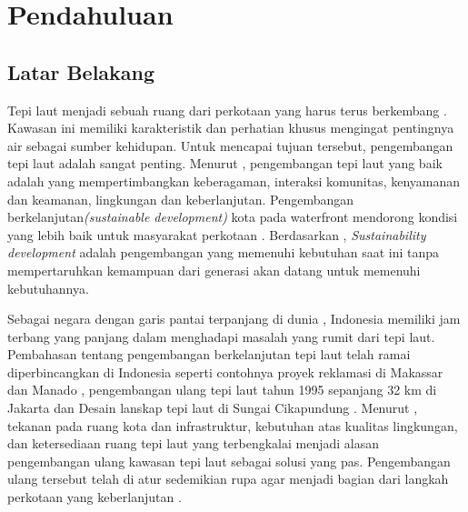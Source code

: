 \documentclass[../projects/thesis.tex]{subfiles}
\begin{document}
\chapter{Pendahuluan}\label{chap:pendahuluan}

\section{Latar Belakang}
Tepi laut menjadi sebuah ruang dari perkotaan yang harus terus berkembang \cite{shamsuddin2013}. Kawasan ini memiliki karakteristik dan perhatian khusus mengingat pentingnya air sebagai sumber kehidupan. Untuk mencapai tujuan tersebut, pengembangan tepi laut adalah sangat penting. Menurut \cite{hussein2014}, pengembangan tepi laut yang baik adalah yang mempertimbangkan keberagaman, interaksi komunitas, kenyamanan dan keamanan, lingkungan dan keberlanjutan. Pengembangan berkelanjutan\textit{(sustainable development)} kota pada waterfront mendorong kondisi yang lebih baik untuk masyarakat perkotaan \citep{brebbia2016sustainable}.
Berdasarkan \cite{imperatives1987}, \textit{Sustainability development} adalah pengembangan yang memenuhi kebutuhan saat ini tanpa mempertaruhkan kemampuan dari generasi akan datang untuk memenuhi kebutuhannya.

Sebagai negara dengan garis pantai terpanjang di dunia \citep{hindersah2015}, Indonesia memiliki jam terbang yang panjang dalam menghadapi masalah yang rumit dari tepi laut. Pembahasan tentang pengembangan berkelanjutan tepi laut telah ramai diperbincangkan di Indonesia seperti contohnya proyek reklamasi di Makassar dan Manado \citep{andi2017,tungka2012, fhuh2017}, pengembangan ulang tepi laut tahun 1995 sepanjang 32 km di Jakarta \citep{pramesti2017} dan Desain lanskap tepi laut di Sungai Cikapundung \citep{ainy2016}. Menurut \cite{breen1993}, tekanan pada ruang kota dan infrastruktur, kebutuhan atas kualitas lingkungan, dan ketersediaan ruang tepi laut yang terbengkalai menjadi alasan pengembangan ulang kawasan tepi laut sebagai solusi yang pas. Pengembangan ulang tersebut telah di atur sedemikian rupa agar menjadi bagian dari langkah perkotaan yang keberlanjutan \citep{pramesti2017}.
\end{document}
